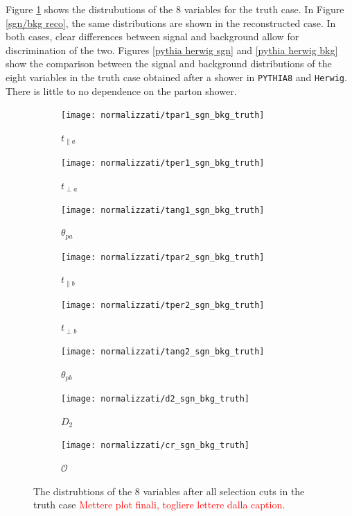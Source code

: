 \documentclass[10pt,a4paper]{book}
\newcommand\todo[1]{\textcolor{red}{#1}}
\def\code#1{\texttt{#1}}
\begin{document}
Figure \ref{sgn/bkg true} shows the distrubutions of the 8 variables for the truth case. In Figure \ref{sgn/bkg reco}, the same distributions are shown in the reconstructed case. In both cases, clear differences between signal and background allow for discrimination of the two. Figures \ref{pythia herwig sgn} and \ref{pythia herwig bkg} show the comparison between the signal and background distributions of the eight variables in the truth case obtained after a shower in \code{PYTHIA8} and \code{Herwig}. There is little to no dependence on the parton shower.

\begin{figure}
\begin{subfigure}{.33\textwidth}
\centering
\texttt{[image: normalizzati/tpar1\_sgn\_bkg\_truth]}
\caption{$t_{\parallel a}$}
\end{subfigure}
\begin{subfigure}{0.33\textwidth}
\centering
\texttt{[image: normalizzati/tper1\_sgn\_bkg\_truth]}
\caption{$t_{\perp a}$}
\end{subfigure}
\begin{subfigure}{.33\textwidth}
\centering
\texttt{[image: normalizzati/tang1\_sgn\_bkg\_truth]}
\caption{$\theta_{pa}$}
\end{subfigure}
\begin{subfigure}{.33\textwidth}
\centering
\texttt{[image: normalizzati/tpar2\_sgn\_bkg\_truth]}
\caption{$t_{\parallel b}$}
\end{subfigure}
\begin{subfigure}{0.33\textwidth}
\centering
\texttt{[image: normalizzati/tper2\_sgn\_bkg\_truth]}
\caption{$t_{\perp b}$}
\end{subfigure}
\begin{subfigure}{.33\textwidth}
\centering
\texttt{[image: normalizzati/tang2\_sgn\_bkg\_truth]}
\caption{$\theta_{pb}$}
\end{subfigure}
\begin{subfigure}{0.5\textwidth}
\centering
\texttt{[image: normalizzati/d2\_sgn\_bkg\_truth]}
\caption{$D_2$}
\end{subfigure}
\begin{subfigure}{.5\textwidth}
\centering
\texttt{[image: normalizzati/cr\_sgn\_bkg\_truth]}
\caption{$\mathcal{O}$}
\end{subfigure}
\caption{The distrubtions of the 8 variables after all selection cuts in the truth case \todo{Mettere plot finali, togliere lettere dalla caption}.}
\label{sgn/bkg true}
\end{figure}
\end{document}
